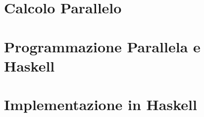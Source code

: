 \documentclass[oneside, 12pt, a4paper]{book}
\begin{document}


\part{Calcolo Parallelo}




\part{Programmazione Parallela e Haskell}




\part{Implementazione in Haskell}


\printbibliography
\end{document}

